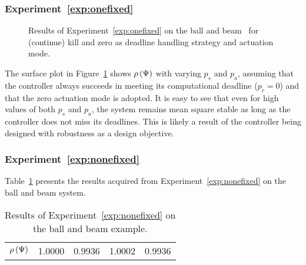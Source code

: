 \subsubsection*{Experiment~\ref{exp:onefixed}}%
%
\begin{figure}[t]
    \centering
    \caption{Results of Experiment~\ref{exp:onefixed} on the ball and beam~\cite{Vreman:2022} for (continue) kill and zero as deadline handling strategy and actuation mode.}
    \label{fig:nils-kz-sa}
\end{figure}
%
The surface plot in Figure~\ref{fig:nils-kz-sa} shows $\rho\left( \Psi \right)$ with varying $p_s$ and $p_a$, assuming that the controller always succeeds in meeting its computational deadline ($p_c=0$) and that the zero actuation mode is adopted.
It is easy to see that even for high values of both $p_s$ and $p_a$, the system remains mean square stable as long as the controller does not miss its deadlines.
This is likely a result of the controller being designed with robustness as a design objective.

\subsubsection*{Experiment~\ref{exp:nonefixed}}%
Table~\ref{tab:bnb} presents the results acquired from Experiment~\ref{exp:nonefixed} on the ball and beam system.
%
\begin{table}[h]
    \centering
    \def\arraystretch{1.25}
    \caption{Results of Experiment~\ref{exp:nonefixed} on the ball and beam example.}
    \label{tab:bnb}
    \begin{tabular}{c|cccc}
                            & \tKZ{} & \tKH{} & \tSZ{} & \tSH{} \\\hline\hline
        $\rho\left( \Psi \right)$  & 1.0000 & 0.9936 & 1.0002 & 0.9936
    \end{tabular}
\end{table}

